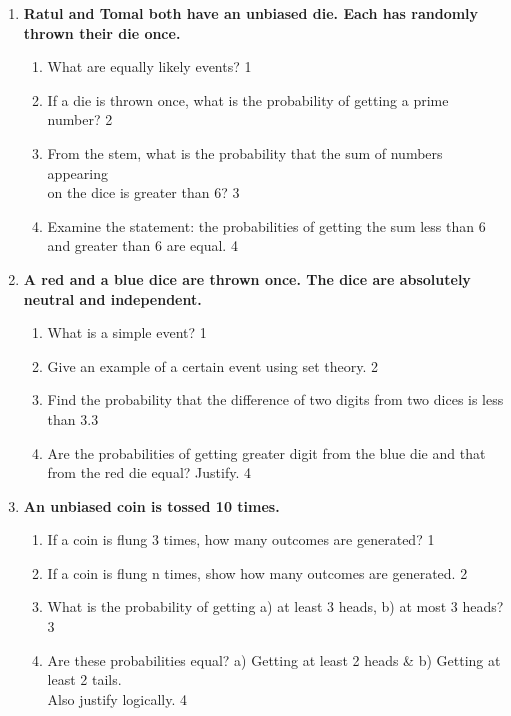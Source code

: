 \documentclass[a4paper,oneside, margin=1.4in]{book}
\begin{document}
\begin{enumerate}
  
       \item
	  \textbf{Ratul and Tomal both have an unbiased die. Each has randomly thrown their die once.} 
  
  \begin{enumerate}
    \item
	What are equally likely events? \hfill 1
    \item
	If a die is thrown once, what is the probability of getting a prime 
	number? \hfill 2
    \item  
	From the stem, what is the probability that the sum of numbers appearing
	\\ on the dice is greater than 6? \hfill 3
    \item
	Examine the statement: the probabilities of getting the sum less than 6 and greater 
	than 6 are equal. \hfill 4
  \end{enumerate}

 \item
	  \textbf{A red and a blue dice are thrown once. The dice are absolutely neutral and independent.} 
  
  \begin{enumerate}
    \item
	What is a simple event? \hfill 1
    \item
	Give an example of a certain event using set theory. \hfill 2
    \item  
	Find the probability that the difference of two digits from two dices is less than 3.\hfill 3
    \item
	Are the probabilities of getting greater digit from the blue die and that from the red die equal? Justify. \hfill 4
  \end{enumerate}
  
  \item
	  \textbf{An unbiased coin is tossed 10 times.} 
  
  \begin{enumerate}
    \item
	If a coin is flung 3 times, how many outcomes are generated? \hfill 1
    \item
	If a coin is flung n times, show how many outcomes are generated. \hfill 2
    \item  
	What is the probability of getting a) at least 3 heads, b) at most 3 heads? \hfill 3
    \item
	Are these probabilities equal? a) Getting at least 2 heads \& b) Getting at least 2 tails. \\ Also justify logically. \hfill 4
  \end{enumerate}
  

\end{enumerate}
\end{document}

